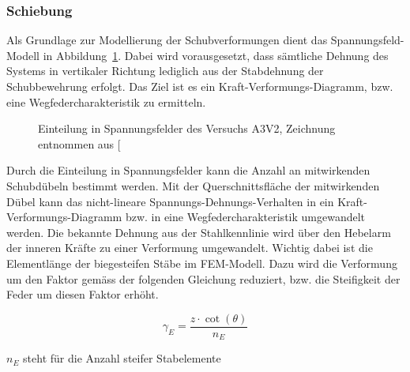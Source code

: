 \documentclass[
  10pt,
  letterpaper,
]{scrreprt}
\begin{document}
\subsubsection{Schiebung}\label{schiebung}

Als Grundlage zur Modellierung der Schubverformungen dient das
Spannungsfeld-Modell in Abbildung~\ref{fig-spannungsfelder_a3v2}. Dabei
wird vorausgesetzt, dass sämtliche Dehnung des Systems in vertikaler
Richtung lediglich aus der Stabdehnung der Schubbewehrung erfolgt. Das
Ziel ist es ein Kraft-Verformungs-Diagramm, bzw. eine
Wegfedercharakteristik zu ermitteln.

\begin{figure}[H]


\caption{\label{fig-spannungsfelder_a3v2}Einteilung in Spannungsfelder
des Versuchs A3V2, Zeichnung entnommen aus
{[}\citeproc{ref-gitz_ansatze_2024}{1}{]}}

\end{figure}%

Durch die Einteilung in Spannungsfelder kann die Anzahl an mitwirkenden
Schubdübeln bestimmt werden. Mit der Querschnittsfläche der mitwirkenden
Dübel kann das nicht-lineare Spannungs-Dehnungs-Verhalten in ein
Kraft-Verformungs-Diagramm bzw. in eine Wegfedercharakteristik
umgewandelt werden. Die bekannte Dehnung aus der Stahlkennlinie wird
über den Hebelarm der inneren Kräfte zu einer Verformung umgewandelt.
Wichtig dabei ist die Elementlänge der biegesteifen Stäbe im FEM-Modell.
Dazu wird die Verformung um den Faktor gemäss der folgenden Gleichung
reduziert, bzw. die Steifigkeit der Feder um diesen Faktor erhöht.

\[
\gamma_{E} = \frac{z \cdot \cot(\theta)}{n_{E}}
\]

\(n_{E}\) steht für die Anzahl steifer Stabelemente
\end{document}
